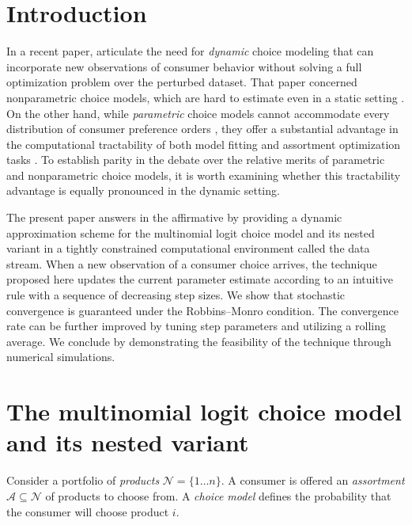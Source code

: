 \documentclass[preprint,12pt,authoryear]{elsarticle}
\begin{document}


\section{Introduction}
In a recent paper, \cite{honguyen2021} articulate the need for \emph{dynamic} choice modeling that can incorporate new observations of consumer behavior without solving a full optimization problem over the perturbed dataset. That paper concerned nonparametric choice models, which are hard to estimate even in a static setting \cite[][]{rusmevichientong2006, farias2013}. On the other hand, while \emph{parametric} choice models cannot accommodate every distribution of consumer preference orders \cite[][]{keane1997}, they offer a substantial advantage in the computational tractability of both model fitting and assortment optimization tasks \cite[][]{bunch1987, davis2014}. To establish parity in the  debate over the relative merits of parametric and nonparametric choice models, it is worth examining whether this tractability advantage is equally pronounced in the dynamic setting. 

The present paper answers in the affirmative by providing a dynamic approximation scheme for the multinomial logit choice model and its nested variant in a tightly constrained computational environment called the data stream. When a new observation of a consumer choice arrives, the technique proposed here updates the current parameter estimate according to an intuitive rule with a sequence of decreasing step sizes. We show that stochastic convergence is guaranteed under the Robbins--Monro condition. The convergence rate can be further improved by tuning step parameters and utilizing a rolling average. We conclude by demonstrating the feasibility of the technique through numerical simulations. 

\section{The multinomial logit choice model and its nested variant}
Consider a portfolio of \emph{products} $\mathcal{N} = \{1 \dots n\}$. A consumer is offered an \emph{assortment} $\mathcal{A} \subseteq \mathcal{N}$ of products to choose from. A \emph{choice model} defines the probability that the consumer will choose product $i$.
\end{document}
